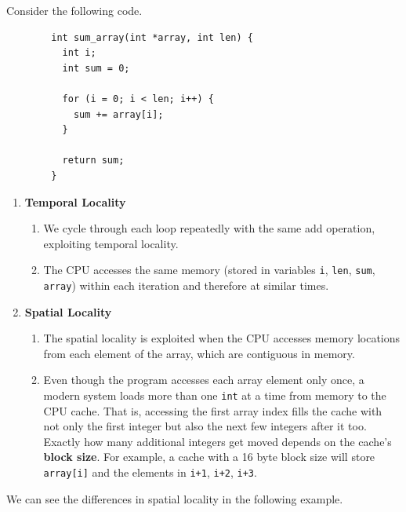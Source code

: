 \documentclass{article}
\begin{document}
    \begin{example}[Locality]
      Consider the following code. 
      \begin{lstlisting}
        int sum_array(int *array, int len) {
          int i;
          int sum = 0;

          for (i = 0; i < len; i++) {
            sum += array[i];
          }

          return sum;
        }
      \end{lstlisting}
      \begin{enumerate}
        \item \textbf{Temporal Locality}
          \begin{enumerate}
            \item We cycle through each loop repeatedly with the same add operation, exploiting temporal locality.  
            \item The CPU accesses the same memory (stored in variables \texttt{i}, \texttt{len}, \texttt{sum}, \texttt{array}) within each iteration and therefore at similar times. 
          \end{enumerate}
        \item \textbf{Spatial Locality}
          \begin{enumerate}
            \item The spatial locality is exploited when the CPU accesses memory locations from each element of the array, which are contiguous in memory. 
            \item Even though the program accesses each array element only once, a modern system loads more than one \texttt{int} at a time from memory to the CPU cache. That is, accessing the first array index fills the cache with not only the first integer but also the next few integers after it too. Exactly how many additional integers get moved depends on the cache's \textbf{block size}. For example, a cache with a 16 byte block size will store \texttt{array[i]} and the elements in \texttt{i+1}, \texttt{i+2}, \texttt{i+3}. 
          \end{enumerate}
      \end{enumerate}
    \end{example}

    We can see the differences in spatial locality in the following example. 
\end{document}
